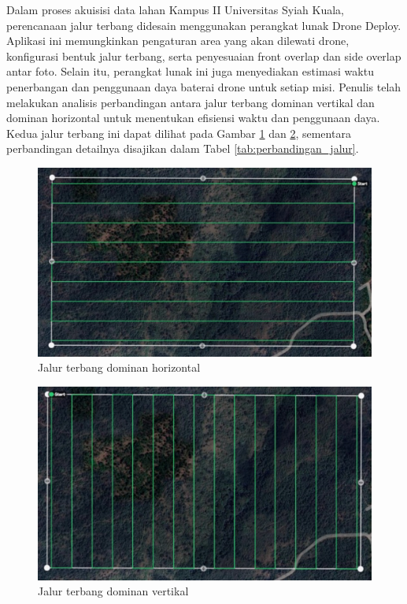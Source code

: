 Dalam proses akuisisi data lahan Kampus II Universitas Syiah Kuala, perencanaan jalur terbang didesain menggunakan perangkat lunak Drone Deploy. Aplikasi ini memungkinkan pengaturan area yang akan dilewati drone, konfigurasi bentuk jalur terbang, serta penyesuaian front overlap dan side overlap antar foto. Selain itu, perangkat lunak ini juga menyediakan estimasi waktu penerbangan dan penggunaan daya baterai drone untuk setiap misi. Penulis telah melakukan analisis perbandingan antara jalur terbang dominan vertikal dan dominan horizontal untuk menentukan efisiensi waktu dan penggunaan daya. Kedua jalur terbang ini dapat dilihat pada Gambar \ref{jalur terbang 1} dan \ref{jalur terbang 2}, sementara perbandingan detailnya disajikan dalam Tabel \ref{tab:perbandingan_jalur}.

\begin{figure}[H]
    \centering
    \includegraphics[width = 11.5cm]{image/desain jalur terbang 1.PNG}
    \caption{Jalur terbang dominan horizontal}
    \label{jalur terbang 1}
\end{figure}

\begin{figure}[H]
    \centering
    \includegraphics[width = 11.5cm]{image/desain jalur terbang 2.PNG}
    \caption{Jalur terbang dominan vertikal}
    \label{jalur terbang 2}
\end{figure}

